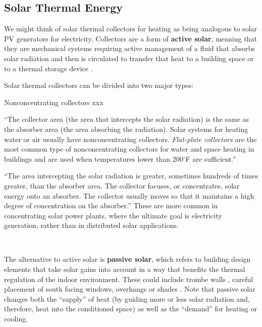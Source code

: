 \documentclass[10pt]{article}
\begin{document}
\subsection{Solar Thermal Energy}

We might think of solar thermal collectors for heating as being analogous to solar PV generators for electricity. Collectors are a form of \textbf{active solar}, meaning that they are mechanical systems requiring active management of a fluid that absorbs solar radiation and then is circulated to transfer that heat to a building space or to a thermal storage device \cite{noauthor_undated-zq}.

Solar thermal collectors can be divided into two major types:

\begin{labeling}{Nonconcentrating collectors xxx}
\item [\textbf{Nonconcentrating collectors}] ``The collector area (the area that intercepts the solar radiation) is the same as the absorber area (the area absorbing the radiation). Solar systems for heating water or air usually have nonconcentrating collectors. \textit{Flat-plate collectors} are the most common type of nonconcentrating collectors for water and space heating in buildings and are used when temperatures lower than 200$^{\circ}$F are sufficient.''\cite{noauthor_undated-zq}
\item [\textbf{Concentrating collectors}] ``The area intercepting the solar radiation is greater, sometimes hundreds of times greater, than the absorber area. The collector focuses, or concentrates, solar energy onto an absorber. The collector usually moves so that it maintains a high degree of concentration on the absorber.'' \cite{noauthor_undated-zq} These are more common in concentrating solar power plants, where the ultimate goal is electricity generation, rather than in distributed solar applications.

\\
\end{labeling}


The alternative to active solar is \textbf{passive solar}, which refers to building design elements that take solar gains into account in a way that benefits the thermal regulation of the indoor environment. These could include trombe walls \cite{noauthor_undated-yi}, careful placement of south facing windows, overhangs or shades \cite{noauthor_undated-zq}. Note that passive solar changes both the ``supply'' of heat (by guiding more or less solar radiation and, therefore, heat into the conditioned space) as well as the ``demand'' for heating or cooling.
\end{document}
